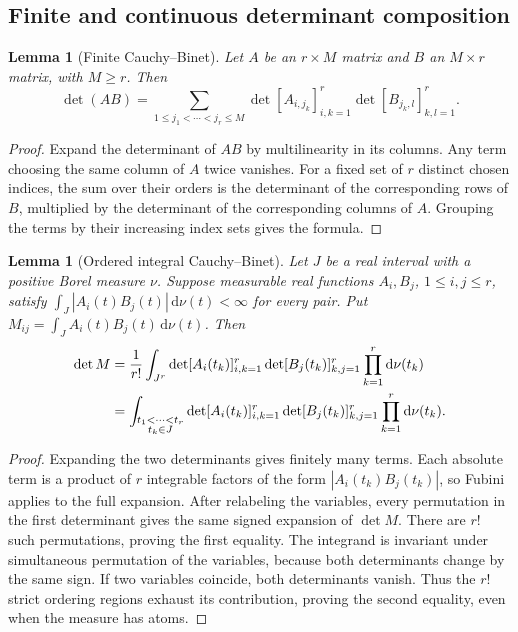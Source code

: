 \documentclass[11pt,a4paper]{article}
\newtheorem{lemma}[theorem]{Lemma}
\theoremstyle{definition}
\theoremstyle{remark}
\begin{document}
\subsection{Finite and continuous determinant composition}

\begin{lemma}[Finite Cauchy--Binet]\label{cb:finite}
Let \(A\) be an \(r\times M\) matrix and \(B\) an
\(M\times r\) matrix, with \(M\ge r\). Then
\begin{equation}\label{cb:finite-equation}
 \det(AB)=
 \sum_{1\le j_1<\cdots<j_r\le M}
 \det[A_{i,j_k}]_{i,k=1}^r
 \det[B_{j_k,l}]_{k,l=1}^r.
\end{equation}
\end{lemma}
\begin{proof}
Expand the determinant of \(AB\) by multilinearity in its columns.
Any term choosing the same column of \(A\) twice vanishes.
For a fixed set of \(r\) distinct chosen indices, the sum over their
orders is the determinant of the corresponding rows of \(B\),
multiplied by the determinant of the corresponding columns of \(A\).
Grouping the terms by their increasing index sets gives the formula.
\end{proof}

\begin{lemma}[Ordered integral Cauchy--Binet]\label{cb:integral}
Let \(J\) be a real interval with a positive Borel measure \(\nu\).
Suppose measurable real functions \(A_i,B_j\), \(1\le i,j\le r\),
satisfy \(\int_J|A_i(t)B_j(t)|\,\mathrm d\nu(t)<\infty\) for every
pair. Put \(M_{ij}=\int_J A_i(t)B_j(t)\,\mathrm d\nu(t)\).
Then
\begin{align}\label{cb:integral-equation}
 \det M
 &=\frac1{r!}\int_{J^r}
  \det[A_i(t_k)]_{i,k=1}^r
  \det[B_j(t_k)]_{k,j=1}^r
  \prod_{k=1}^r\mathrm d\nu(t_k)\notag\\
 &=\int_{\substack{t_1<\cdots<t_r\\t_k\in J}}
  \det[A_i(t_k)]_{i,k=1}^r
  \det[B_j(t_k)]_{k,j=1}^r
  \prod_{k=1}^r\mathrm d\nu(t_k).
\end{align}
\end{lemma}
\begin{proof}
Expanding the two determinants gives finitely many terms. Each absolute
term is a product of \(r\) integrable factors of the form
\(|A_i(t_k)B_j(t_k)|\), so Fubini applies to the full expansion.
After relabeling the variables, every permutation in the first
determinant gives the same signed expansion of \(\det M\).
There are \(r!\) such permutations, proving the first equality.
The integrand is invariant under simultaneous permutation of the
variables, because both determinants change by the same sign.
If two variables coincide, both determinants vanish. Thus the
\(r!\) strict ordering regions exhaust its contribution, proving the
second equality, even when the measure has atoms.
\end{proof}
\end{document}
